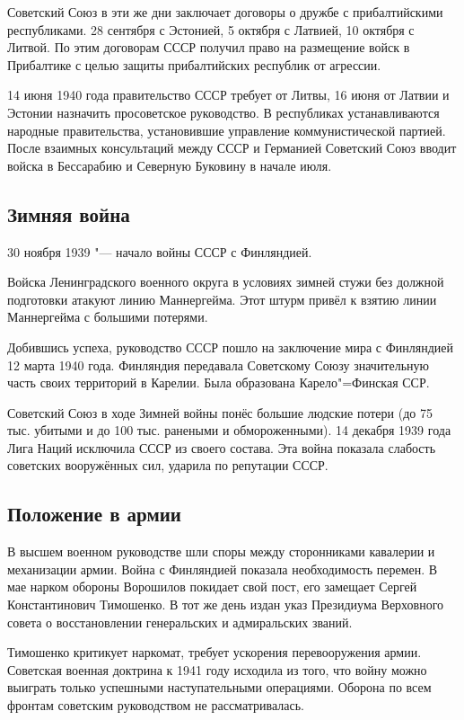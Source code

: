 Советский Союз в эти же дни заключает договоры о дружбе с прибалтийскими республиками. 28 сентября с Эстонией, 5 октября с Латвией, 10 октября с Литвой. По этим договорам СССР получил право на размещение войск в Прибалтике с целью защиты прибалтийских республик от агрессии.

14 июня 1940 года правительство СССР требует от Литвы, 16 июня от Латвии и Эстонии назначить просоветское руководство. В республиках устанавливаются народные правительства, установившие управление коммунистической партией. После взаимных консультаций между СССР и Германией Советский Союз вводит войска в Бессарабию и Северную Буковину в начале июля.

\subsection{Зимняя война}

30 ноября 1939 "--- начало войны СССР с Финляндией.

Войска Ленинградского военного округа в условиях зимней стужи без должной подготовки атакуют линию Маннергейма. Этот штурм привёл к взятию линии Маннергейма с большими потерями.

Добившись успеха, руководство СССР пошло на заключение мира с Финляндией 12 марта 1940 года. Финляндия передавала Советскому Союзу значительную часть своих территорий в Карелии. Была образована Карело"=Финская ССР.

Советский Союз в ходе Зимней войны понёс большие людские потери (до 75 тыс. убитыми и до 100 тыс. ранеными и обмороженными). 14 декабря 1939 года Лига Наций исключила СССР из своего состава. Эта война показала слабость советских вооружённых сил, ударила по репутации СССР.

\subsection{Положение в армии}
В высшем военном руководстве шли споры между сторонниками кавалерии и механизации армии.
Война с Финляндией показала необходимость перемен. В мае нарком обороны Ворошилов покидает свой пост, его замещает Сергей Константинович Тимошенко. В тот же день издан указ Президиума Верховного совета о восстановлении генеральских и адмиральских званий.

Тимошенко критикует наркомат, требует ускорения перевооружения армии. Советская военная доктрина к 1941 году исходила из того, что войну можно выиграть только успешными наступательными операциями. Оборона по всем фронтам советским руководством не рассматривалась.

